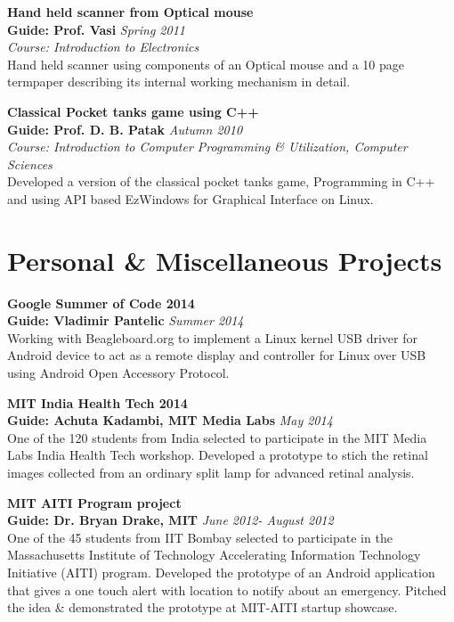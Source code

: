 \documentclass[margin,line]{resume}
\begin{document}
\begin{resume}
	{\bf Hand held scanner from Optical mouse} \\
    {\bf Guide: Prof. Vasi} 	\hfill \textit{Spring 2011} \\
    { \it Course: Introduction to Electronics}\\
    Hand held scanner using components of an Optical mouse and a 10 page termpaper describing its internal working mechanism in detail.
	
	{\bf Classical Pocket tanks game using C++} \\
    {\bf Guide: Prof. D. B. Patak} 	\hfill \textit{Autumn 2010} \\
    { \it Course: Introduction to Computer Programming \& Utilization, Computer Sciences}\\
	Developed a version of the classical pocket tanks game, Programming in C++ and using API based EzWindows for Graphical Interface on Linux.

\vspace{3mm}

\section{\mysidestyle Personal \& Miscellaneous Projects}
\vspace{0mm}

    {\bf Google Summer of Code 2014} \\
    {\bf Guide: Vladimir Pantelic} 	\hfill \textit{Summer 2014} \\   
	Working with Beagleboard.org to implement a Linux kernel USB driver for Android device to act as a remote display and controller for Linux over USB using Android Open Accessory Protocol.
	
    {\bf MIT India Health Tech 2014} \\
    {\bf Guide: Achuta Kadambi, MIT Media Labs} 	\hfill \textit{May 2014} \\   
	One of the 120 students from India selected to participate in the MIT Media Labs India Health Tech workshop. Developed a prototype to stich the retinal images collected from an ordinary split lamp for advanced retinal analysis.
	
    {\bf MIT AITI Program project} \\
    {\bf Guide: Dr. Bryan Drake, MIT} 	\hfill \textit{June 2012- August 2012} \\   
	One of the 45 students from IIT Bombay selected to participate in the  Massachusetts Institute of Technology Accelerating Information Technology Initiative (AITI) program. Developed the prototype of an Android application that gives a one touch alert with location to notify about an emergency. Pitched the idea \& demonstrated the prototype at MIT-AITI startup showcase.
	

\end{resume}
\end{document}
